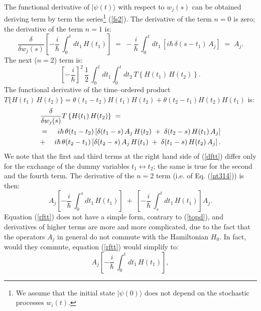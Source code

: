 \documentclass[10pt,a4paper]{article}
\begin{document}
The functional derivative of $|\psi(t)\rangle$ with respect to
$w_{j}(s)$ can be obtained deriving  term by term the
series\footnote{We assume that the initial state $|\psi(0)\rangle$
does not depend on the stochastic processes $w_{i}(t)$.}
(\ref{fs2}). The derivative of the term $n=0$ is zero; the
derivative of the term $n=1$ is:
\begin{equation} \label{topd}
\frac{\delta}{\delta w_{j}(s)} \left[ -\frac{i}{\hbar}\,
\int_{0}^{t} dt_{1}\, H(t_{1}) \right] \; = \; -\frac{i}{\hbar}\,
\int_{0}^{t} dt_{1}\, \left[ i\hbar\, \delta(s - t_{1})\, A_{j}
\right] \; = \; A_{j}.
\end{equation}
The next ($n=2$) term is:
\begin{equation} \label{nt314}
\left[-\frac{i}{\hbar}\right]^{2}\, \frac{1}{2}\, \int_{0}^{t}
dt_{1} \int_{0}^{t} dt_{2}\, T\left\{H(t_{1}) \, H(t_{2})
\right\}.
\end{equation}
The functional derivative of the time--ordered product $T \{
H(t_{1})\, H(t_{2}) \} = \theta(t_{1}-t_{2})H(t_{1})H(t_{2}) +
\theta(t_{2} - t_{1}) H(t_{2}) H(t_{1})$ is:
\begin{eqnarray} \label{dftt}
\lefteqn{\frac{\delta}{\delta w_{j}(s)} T\left\{ H(t_{1}) \,
H(t_{2}) \right\} \; = \qquad\quad} \nonumber \\
& = & i\hbar\,\theta(t_{1}-t_{2})\left[ \delta(t_{1} - s)\,
A_{j}\, H(t_{2}) \; + \; \delta(t_{2} - s)\, H(t_{1})\, A_{j}
\right] \nonumber \\
& + & i\hbar\,\theta(t_{2}-t_{1})\left[ \delta(t_{2} - s)\,
A_{j}\, H(t_{1}) \; + \; \delta(t_{1} - s)\, H(t_{2})\, A_{j}
\right].
\end{eqnarray}
We note that the first and third terms at the right hand side of
(\ref{dftt}) differ only for the exchange of the dummy variables
$t_{1} \leftrightarrow t_{2}$; the same is true for the second and
the fourth term. The derivative of the $n=2$ term (i.e. of Eq.
(\ref{nt314}))  is then:
\begin{equation} \label{rftt}
A_{j} \left[ -\frac{i}{\hbar}\, \int_{0}^{s} dt_{1}\, H(t_{1})
\right] \; + \; \left[ -\frac{i}{\hbar}\, \int_{s}^{t} dt_{1}\,
H(t_{1}) \right] A_{j}.
\end{equation}
Equation (\ref{rftt}) does not have a simple form, contrary to
(\ref{topd}), and derivatives of higher terms are more and more
complicated, due to the fact that the operators $A_{j}$ in general
do not commute with the Hamiltonian $H_{0}$. In fact, would they
commute, equation (\ref{rftt}) would simplify to:
\begin{equation}
A_{j} \left[ -\frac{i}{\hbar}\, \int_{0}^{t} dt_{1}\, H(t_{1})
\right],
\end{equation}
\end{document}
